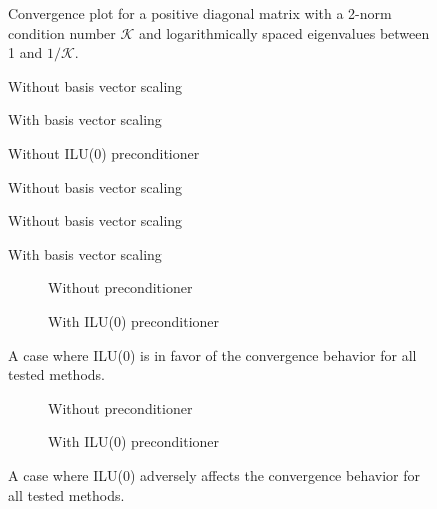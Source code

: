 \documentclass{scrartcl}
\numberwithin{equation}{section}
\begin{document}
\begin{figure}[H]
	\centering
	\resizebox{.9\textwidth}{!}{}	
	\caption{Convergence plot for a positive diagonal matrix with a 2-norm condition number $\mathcal{K}$ and logarithmically spaced eigenvalues between 1 and $1/\mathcal{K}$.}
	\label{fig:dmat3}
\end{figure}

\begin{figure}[H]
	\centering
	\resizebox{.9\textwidth}{!}{}
	\caption{Without basis vector scaling}
	\label{fig:watt1_noscale}
\end{figure}
\begin{figure}[H]
	\centering
	\resizebox{.9\textwidth}{!}{}
	\caption{With basis vector scaling}
	\label{fig:watt1_scale}
\end{figure}
\begin{figure}[H]
	\centering
	\resizebox{.9\textwidth}{!}{}
	\caption{Without ILU(0) preconditioner}
	\label{fig:watt1_ilu0}
\end{figure}
\begin{figure}[H]
	\centering
	\resizebox{.9\textwidth}{!}{}
	\caption{Without basis vector scaling}
	\label{fig:bmw7st1}
\end{figure}

\begin{figure}[H]
	\centering
	\resizebox{.9\textwidth}{!}{}
	\caption{Without basis vector scaling}
	\label{fig:xenon2_noscale}
\end{figure}
\begin{figure}[H]
	\centering
	\resizebox{.9\textwidth}{!}{}
	\caption{With basis vector scaling}
	\label{fig:xenon2_scale}
\end{figure}

\begin{figure}[H]
\centering
\begin{subfigure}{.5\textwidth}
  \centering
  \resizebox{.9\textwidth}{!}{}
  \caption{Without preconditioner}
  \label{fig:sherman3_unscaled}
\end{subfigure}%
\begin{subfigure}{.5\textwidth}
  \centering
  \resizebox{.9\textwidth}{!}{}
  \caption{With ILU(0) preconditioner}
  \label{fig:sherman3_ilu0}
\end{subfigure}
\caption{A case where ILU(0) is in favor of the convergence behavior for all tested methods.}
\label{fig:sherman3_convergence}
\begin{subfigure}{.5\textwidth}
  \centering
  \resizebox{.9\textwidth}{!}{}
  \caption{Without preconditioner}
  \label{fig:xenon2_noprec}
\end{subfigure}%
\begin{subfigure}{.5\textwidth}
  \centering
  \resizebox{.9\textwidth}{!}{}
  \caption{With ILU(0) preconditioner}
  \label{fig:xenon2_ilu0}
\end{subfigure}
\caption{A case where ILU(0) adversely affects the convergence behavior for all tested methods.}
\label{fig:convergence_prec}
\end{figure}
\end{document}
